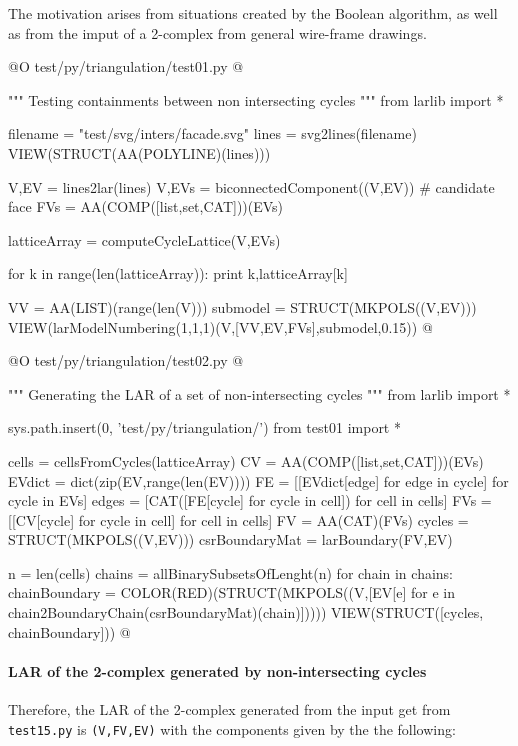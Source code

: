 \documentclass[11pt,oneside]{article}    %
\begin{document}
The motivation arises from situations created by the Boolean algorithm, as well as from the imput of a 2-complex from general wire-frame drawings.

@O test/py/triangulation/test01.py
@{""" Testing containments between non intersecting cycles """
from larlib import *

filename = "test/svg/inters/facade.svg"
lines = svg2lines(filename)
VIEW(STRUCT(AA(POLYLINE)(lines)))

V,EV = lines2lar(lines)
V,EVs = biconnectedComponent((V,EV))
# candidate face
FVs = AA(COMP([list,set,CAT]))(EVs)

latticeArray = computeCycleLattice(V,EVs)

for k in range(len(latticeArray)):
   print k,latticeArray[k]

VV = AA(LIST)(range(len(V)))
submodel = STRUCT(MKPOLS((V,EV)))
VIEW(larModelNumbering(1,1,1)(V,[VV,EV,FVs],submodel,0.15)) 
@}


@O test/py/triangulation/test02.py
@{""" Generating the LAR of a set of non-intersecting cycles """
from larlib import *

sys.path.insert(0, 'test/py/triangulation/')
from test01 import *

cells = cellsFromCycles(latticeArray)
CV = AA(COMP([list,set,CAT]))(EVs)
EVdict = dict(zip(EV,range(len(EV))))
FE = [[EVdict[edge] for edge in cycle] for cycle in EVs] 
edges = [CAT([FE[cycle] for cycle in cell]) for cell in cells]
FVs = [[CV[cycle] for cycle in cell] for cell in cells]
FV = AA(CAT)(FVs)
cycles = STRUCT(MKPOLS((V,EV)))
csrBoundaryMat = larBoundary(FV,EV)

n = len(cells)
chains = allBinarySubsetsOfLenght(n)
for chain in chains:
    chainBoundary = COLOR(RED)(STRUCT(MKPOLS((V,[EV[e] 
                        for e in chain2BoundaryChain(csrBoundaryMat)(chain)]))))
    VIEW(STRUCT([cycles, chainBoundary]))
@}


\paragraph{LAR of the 2-complex generated by non-intersecting cycles}

Therefore, the LAR of the 2-complex generated from the input get from \texttt{test15.py}
is \texttt{(V,FV,EV)} with the components given by the the following:
\end{document}
